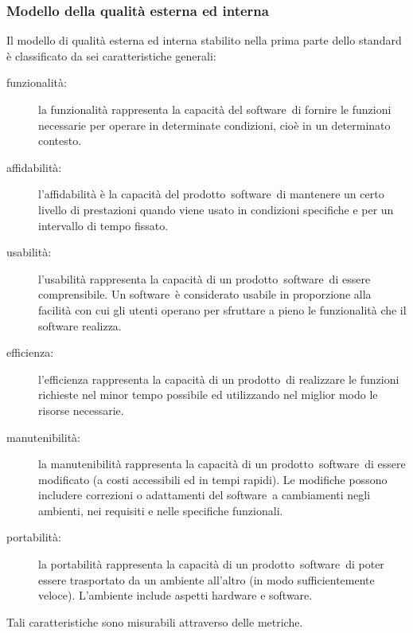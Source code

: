 \documentclass[../PianoDiQualifica.tex]{subfiles}
\begin{document}
\begin{appendices}
		\subsubsection{Modello della qualità esterna ed interna}
		Il modello di qualità esterna ed interna stabilito nella prima parte dello standard è classificato da sei caratteristiche generali:
		\begin{description}
			\item[funzionalità:] la funzionalità rappresenta la capacità del software\g\ di fornire le funzioni necessarie per operare in determinate condizioni, cioè in un determinato contesto.
			\item[affidabilità:] l'affidabilità è la capacità del prodotto\g\ software\g\ di mantenere un certo livello di prestazioni quando viene usato in condizioni specifiche e per un intervallo di tempo fissato.
			\item[usabilità:] l'usabilità rappresenta la capacità di un prodotto\g\ software\g\ di essere comprensibile. Un software\g\ è considerato usabile in proporzione alla facilità con cui gli utenti operano per sfruttare a pieno le funzionalità che il software realizza.
			\item[efficienza:] l'efficienza rappresenta la capacità di un prodotto\g\ di realizzare le funzioni richieste nel minor tempo possibile ed utilizzando nel miglior modo le risorse necessarie.
			\item[manutenibilità:] la manutenibilità rappresenta la capacità di un prodotto\g\ software\g\ di essere modificato (a costi accessibili ed in tempi rapidi). Le modifiche possono includere correzioni o adattamenti del software\g\ a cambiamenti negli ambienti, nei requisiti e nelle specifiche funzionali.
			\item[portabilità:] la portabilità rappresenta la capacità di un prodotto\g\ software\g\ di poter essere trasportato da un ambiente all'altro (in modo sufficientemente veloce). L'ambiente include aspetti hardware e software\g.
		\end{description}
		Tali caratteristiche sono misurabili attraverso delle metriche.
		

\end{appendices}
\end{document}
